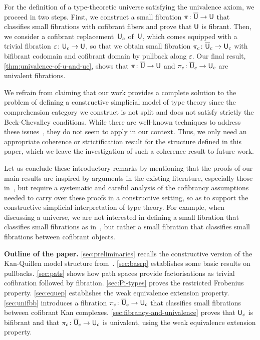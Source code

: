 \documentclass[reqno,10pt,a4paper,oneside,draft]{amsart}
\begin{document}
For the definition of a  type-theoretic universe satisfying the univalence axiom, we proceed
in two steps. First, we construct a small fibration $\pi \colon \overline{\mathsf{U}} \to \mathsf{U}$ that classifies small fibrations with cofibrant fibers and prove that $\mathsf{U}$ is fibrant. 
Then, we consider a cofibrant replacement~$\mathsf{U}_c$ of~$\mathsf{U}$, which comes equipped with a trivial fibration $\varepsilon \colon \mathsf{U}_c \to \mathsf{U}$, so that 
we obtain small fibration $\pi_c \colon \overline{\mathsf{U}}_c \to \mathsf{U}_c$ with bifibrant codomain and cofibrant domain by pullback along $\varepsilon$. Our final result, \cref{thm:univalence-of-u-and-uc}, shows that
$\pi \colon \overline{\mathsf{U}} \to \mathsf{U}$ and $\pi_c \colon \overline{\mathsf{U}}_c \to \mathsf{U}_c$ are univalent fibrations. 



We refrain from claiming that our work provides a complete solution to the problem of defining a constructive simplicial model of type theory since the comprehension category we construct is not split and does not
satisfy strictly the Beck-Chevalley conditions. While there are well-known techniques to address these issues~\cite{voevodsky-simplicial-model,LumsdaineP:locuoc}, they do not seem to apply in our  context.
Thus, we only need an appropriate coherence or strictification result for the structure defined in this paper, 
which we leave the investigation of such a coherence result to future work.

Let us conclude these introductory remarks by mentioning that the proofs of our main results are inspired by arguments  in the existing literature, especially those in~\cite{voevodsky-simplicial-model}, but require a systematic
and careful analysis of the cofibrancy assumptions needed to carry over these proofs in a constructive
setting, so as to support the constructive simplicial interpretation of type theory. For example,
when discussing a universe, we are not interested in defining a small fibration that classifies small fibrations as in~\cite{voevodsky-simplicial-model}, but
rather a small fibration that classifies small fibrations between cofibrant objects. 




\noindent 
\textbf{Outline of the paper.} \cref{sec:preliminaries} recalls the constructive version of the 
Kan-Quillen model structure from~\cite{henry2019qms}. \cref{sec:basrp} establishes some basic results on pullbacks. \cref{sec:pats} shows how path spaces provide factorisations
as trivial cofibration followed by fibration. \cref{sec:Pi-types} proves the restricted Frobenius property. \cref{sec:equep}
establishes the weak equivalence extension property.
\cref{sec:unifbb} introduces a fibration $\pi_c \colon \overline{\mathsf{U}}_c \to \mathsf{U}_c$ that classifies small fibrations
between cofibrant Kan complexes. \cref{sec:fibrancy-and-univalence} proves that $\mathsf{U}_c$ is bifibrant and that $\pi_c \colon \overline{\mathsf{U}}_c \to \mathsf{U}_c$ is univalent, using the weak equivalence extension property.
\end{document}
